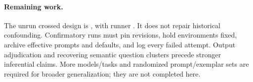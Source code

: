 \paragraph{Remaining work.}
The unrun crossed design is , with runner . It does not repair historical confounding. Confirmatory runs must pin revisions, hold environments fixed, archive effective prompts and defaults, and log every failed attempt. Output adjudication and recovering semantic question clusters precede stronger inferential claims. More models/tasks and randomized prompt/exemplar sets are required for broader generalization; they are not completed here.
